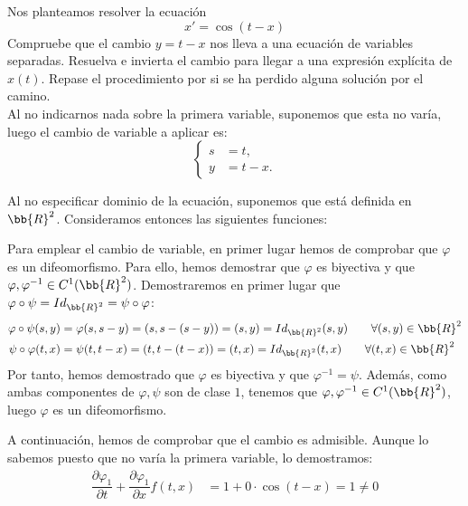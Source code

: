 \begin{ejercicio}
    Nos planteamos resolver la ecuación
    \begin{equation*}
        x' = \cos(t - x)
    \end{equation*}
    Compruebe que el cambio $y = t - x$ nos lleva a una ecuación de variables separadas. Resuelva e invierta el cambio para llegar a una expresión explícita de $x(t)$. Repase el procedimiento por si se ha perdido alguna solución por el camino.\\

    Al no indicarnos nada sobre la primera variable, suponemos que esta no varía, luego el cambio de variable a aplicar es:
    \begin{equation*}
        \left\{
            \begin{aligned}
                s &= t,\\
                y &= t - x.
            \end{aligned}
        \right.
    \end{equation*}

    Al no especificar dominio de la ecuación, suponemos que está definida en $\bb{R}^2$. Consideramos entonces las siguientes funciones:

    Para emplear el cambio de variable, en primer lugar hemos de comprobar que $\varphi$ es un difeomorfismo.
    Para ello, hemos demostrar que $\varphi$ es biyectiva y que $\varphi,\varphi^{-1}\in C^1(\bb{R}^2)$.
    Demostraremos en primer lugar que $\varphi\circ \psi = Id_{\bb{R}^2}= \psi\circ \varphi$:
    \begin{align*}
        \varphi\circ \psi(s,y) &= \varphi(s, s-y) = (s, s-(s-y)) = (s, y) = Id_{\bb{R}^2}(s,y) \qquad \forall (s,y)\in \bb{R}^2\\
        \psi\circ \varphi(t,x) &= \psi(t, t-x) = (t, t-(t-x)) = (t, x) = Id_{\bb{R}^2}(t,x) \qquad \forall (t,x)\in \bb{R}^2
    \end{align*}
    Por tanto, hemos demostrado que $\varphi$ es biyectiva y que $\varphi^{-1}=\psi$. Además, como ambas componentes de $\varphi,\psi$ son de clase $1$, tenemos que $\varphi,\varphi^{-1}\in C^1(\bb{R}^2)$, luego $\varphi$ es un difeomorfismo.

    A continuación, hemos de comprobar que el cambio es admisible. Aunque lo sabemos puesto que no varía la primera variable, lo demostramos:
    \begin{align*}
        \dfrac{\partial \varphi_1}{\partial t} + \dfrac{\partial \varphi_1}{\partial x} f(t,x) &= 1 + 0 \cdot \cos(t-x) = 1\neq 0
    \end{align*}


\end{ejercicio}
